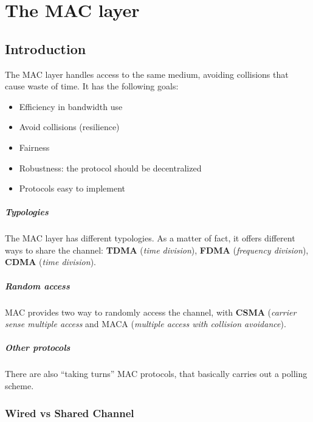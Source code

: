 \chapter{The MAC layer}

\section{Introduction}

The MAC layer handles access to the same medium, avoiding collisions that cause
waste of time.
It has the following goals:
\begin{itemize}
\item Efficiency in bandwidth use
\item Avoid collisions (resilience)
\item Fairness
\item Robustness: the protocol should be decentralized
\item Protocols easy to implement
\end{itemize}

\paragraph*{Typologies} The MAC layer has different typologies. As a matter of
fact, it offers different ways to share the channel: \textbf{TDMA}
(\textit{time division}), \textbf{FDMA} (\textit{frequency division}),
\textbf{CDMA} (\textit{time division}).
\paragraph*{Random access} MAC provides two way to randomly access the channel,
with \textbf{CSMA}
(\textit{carrier sense multiple access} and MACA (\textit{multiple access with
  collision avoidance}).
\paragraph*{Other protocols} There are also ``taking turns'' MAC protocols, that
basically carries out a
polling scheme.

\subsection{Wired vs Shared Channel}

